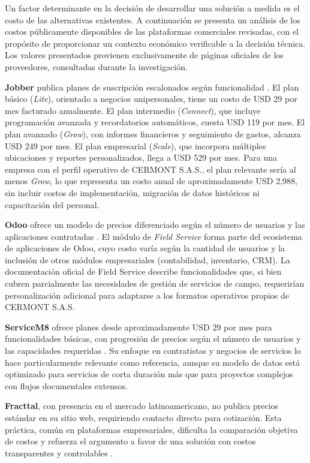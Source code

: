 Un factor determinante en la decisión de desarrollar una solución a medida es el costo de las alternativas existentes. A continuación se presenta un análisis de los costos públicamente disponibles de las plataformas comerciales revisadas, con el propósito de proporcionar un contexto económico verificable a la decisión técnica. Los valores presentados provienen exclusivamente de páginas oficiales de los proveedores, consultadas durante la investigación.

\textbf{Jobber} publica planes de suscripción escalonados según funcionalidad \cite{jobber_pricing}. El plan básico (\textit{Lite}), orientado a negocios unipersonales, tiene un costo de USD 29 por mes facturado anualmente. El plan intermedio (\textit{Connect}), que incluye programación avanzada y recordatorios automáticos, cuesta USD 119 por mes. El plan avanzado (\textit{Grow}), con informes financieros y seguimiento de gastos, alcanza USD 249 por mes. El plan empresarial (\textit{Scale}), que incorpora múltiples ubicaciones y reportes personalizados, llega a USD 529 por mes. Para una empresa con el perfil operativo de CERMONT S.A.S., el plan relevante sería al menos \textit{Grow}, lo que representa un costo anual de aproximadamente USD 2,988, sin incluir costos de implementación, migración de datos históricos ni capacitación del personal.

\textbf{Odoo} ofrece un modelo de precios diferenciado según el número de usuarios y las aplicaciones contratadas \cite{odoo_pricing}. El módulo de \textit{Field Service} forma parte del ecosistema de aplicaciones de Odoo, cuyo costo varía según la cantidad de usuarios y la inclusión de otros módulos empresariales (contabilidad, inventario, CRM). La documentación oficial de Field Service \cite{odoo_field_service} describe funcionalidades que, si bien cubren parcialmente las necesidades de gestión de servicios de campo, requerirían personalización adicional para adaptarse a los formatos operativos propios de CERMONT S.A.S.

\textbf{ServiceM8} ofrece planes desde aproximadamente USD 29 por mes para funcionalidades básicas, con progresión de precios según el número de usuarios y las capacidades requeridas \cite{servicem8_pricing}. Su enfoque en contratistas y negocios de servicios lo hace particularmente relevante como referencia, aunque su modelo de datos está optimizado para servicios de corta duración más que para proyectos complejos con flujos documentales extensos.

\textbf{Fracttal}, con presencia en el mercado latinoamericano, no publica precios estándar en su sitio web, requiriendo contacto directo para cotización. Esta práctica, común en plataformas empresariales, dificulta la comparación objetiva de costos y refuerza el argumento a favor de una solución con costos transparentes y controlables \cite{fracttal}.

